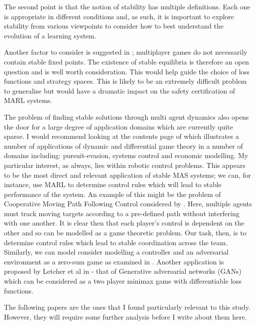 \documentclass[preprint,8pt]{report}
\begin{document}
The second point is that the notion of stability has multiple definitions. Each one is appropriate in different conditions and, as such, it is important to explore stability from various viewpoints to consider how to best understand the evolution of a learning system. 

Another factor to consider is suggested in \cite{Milchtaich2007StaticGames}; multiplayer games do not necessarily contain stable fixed points. The existence of stable equilibria is therefore an open question and is well worth consideration. This would help guide the choice of loss functions and strategy spaces. This is likely to be an extremely difficult problem to generalise but would have a dramatic impact on the safety certification of MARL systems.

The problem of finding stable solutions through multi agent dynamics also opens the door for a large degree of application domains which are currently quite sparse. I would recommend looking at the contents page of \cite{Hamalainen1991DifferentialFinland} which illustrates a number of applications of dynamic and differential game theory in a number of domains including: pursuit-evasion, systems control and economic modelling. My particular interest, as always, lies within robotic control problems. This appears to be the most direct and relevant application of stable MAS systems; we can, for instance, use MARL to determine control rules which will lead to stable performance of the system. An example of this might be the problem of Cooperative Moving Path Following Control considered by \cite{Reis2019RobustVehicles}. Here, multiple agents must track moving targets according to a pre-defined path without interfering with one another. It is clear then that each player's control is dependent on the other and so can be modelled as a game theoretic problem. Our task, then, is to determine control rules which lead to stable coordination across the team. Similarly, we can model consider modelling a controller and an adversarial environment as a zero-sum game as examined in \cite{Marden2018AnnualControl}. Another application is proposed by Letcher et al in \cite{Letcher2019DifferentiableMechanics} - that of Generative adversarial networks (GANs) which can be considered as a two player minimax game with differentiable loss functions. 

The following papers \cite{Bailey2019FiniteDescent-Ascent, Bailey2019Multi-AgentSystem, Boone2019FromTheory, DickensTheLearning, Berkenkamp2017SafeGuarantees, Jin2018Stability-certifiedPerspective, Letcher2019DifferentiableMechanics} are the ones that I found particularly relevant to this study. However, they will require some further analysis before I write about them here.




\end{document}
